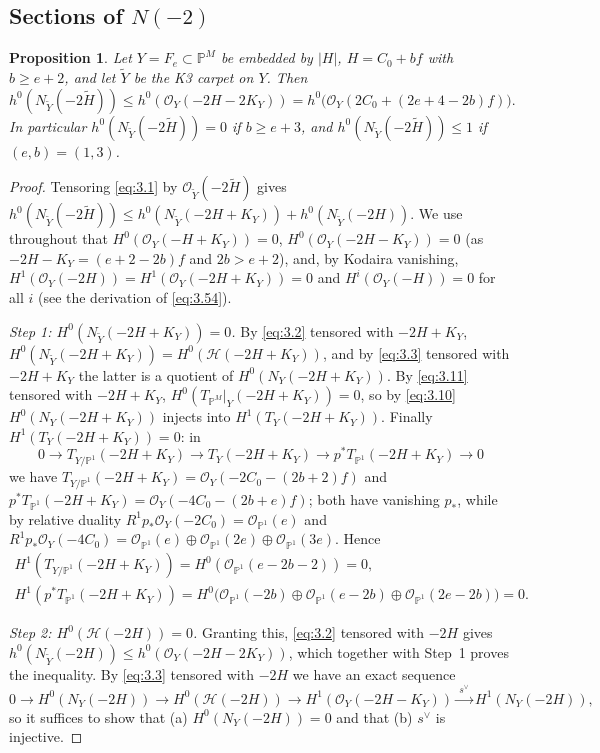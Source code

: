 \documentclass[11pt,reqno]{amsart}
\theoremstyle{plain}
\newtheorem{proposition}[theorem]{Proposition}
\theoremstyle{definition}
\newcommand{\PP}{\mathbb{P}}
\newcommand{\PM}{\mathbb{P}^M}
\newcommand{\OO}{\mathcal{O}}
\newcommand{\Yt}{\widetilde{Y}}
\newcommand{\Ht}{\widetilde{H}}
\newcommand{\NY}{N_{Y}}
\newcommand{\NYt}{N_{\Yt}}
\newcommand{\Hc}{\mathcal{H}}
\newcommand{\TP}{T_{\PM}|_Y}
\begin{document}
\subsection{Sections of \texorpdfstring{$N(-2)$}{N(-2)}}

\begin{proposition}\label{prop:N2}
Let $Y=F_e\subset\PM$ be embedded by $|H|$, $H=C_0+bf$ with $b\ge e+2$, and let $\Yt$ be the K3 carpet on $Y$. Then
\[
h^0(\NYt(-2\Ht))\le h^0(\OO_Y(-2H-2K_Y))=h^0\big(\OO_Y(2C_0+(2e+4-2b)f)\big).
\]
In particular $h^0(\NYt(-2\Ht))=0$ if $b\ge e+3$, and $h^0(\NYt(-2\Ht))\le1$ if $(e,b)=(1,3)$.
\end{proposition}

\begin{proof}
Tensoring \eqref{eq:3.1} by $\OO_{\Yt}(-2\Ht)$ gives $h^0(\NYt(-2\Ht))\le h^0(\NYt(-2H+K_Y))+h^0(\NYt(-2H))$. We use throughout that $H^0(\OO_Y(-H+K_Y))=0$, $H^0(\OO_Y(-2H-K_Y))=0$ (as $-2H-K_Y=(e+2-2b)f$ and $2b>e+2$), and, by Kodaira vanishing, $H^1(\OO_Y(-2H))=H^1(\OO_Y(-2H+K_Y))=0$ and $H^i(\OO_Y(-H))=0$ for all $i$ (see the derivation of \eqref{eq:3.54}).

\emph{Step 1: $H^0(\NYt(-2H+K_Y))=0$.} By \eqref{eq:3.2} tensored with $-2H+K_Y$, $H^0(\NYt(-2H+K_Y))=H^0(\Hc(-2H+K_Y))$, and by \eqref{eq:3.3} tensored with $-2H+K_Y$ the latter is a quotient of $H^0(\NY(-2H+K_Y))$. By \eqref{eq:3.11} tensored with $-2H+K_Y$, $H^0(\TP(-2H+K_Y))=0$, so by \eqref{eq:3.10} $H^0(\NY(-2H+K_Y))$ injects into $H^1(T_Y(-2H+K_Y))$. Finally $H^1(T_Y(-2H+K_Y))=0$: in
\[
0\to T_{Y/\PP^1}(-2H+K_Y)\to T_Y(-2H+K_Y)\to p^*T_{\PP^1}(-2H+K_Y)\to0
\]
we have $T_{Y/\PP^1}(-2H+K_Y)=\OO_Y(-2C_0-(2b+2)f)$ and $p^*T_{\PP^1}(-2H+K_Y)=\OO_Y(-4C_0-(2b+e)f)$; both have vanishing $p_*$, while by relative duality $R^1p_*\OO_Y(-2C_0)=\OO_{\PP^1}(e)$ and $R^1p_*\OO_Y(-4C_0)=\OO_{\PP^1}(e)\oplus\OO_{\PP^1}(2e)\oplus\OO_{\PP^1}(3e)$. Hence
\begin{gather*}
H^1(T_{Y/\PP^1}(-2H+K_Y))=H^0(\OO_{\PP^1}(e-2b-2))=0,\\
H^1(p^*T_{\PP^1}(-2H+K_Y))=H^0\big(\OO_{\PP^1}(-2b)\oplus\OO_{\PP^1}(e-2b)\oplus\OO_{\PP^1}(2e-2b)\big)=0 .
\end{gather*}

\emph{Step 2: $H^0(\Hc(-2H))=0$.} Granting this, \eqref{eq:3.2} tensored with $-2H$ gives $h^0(\NYt(-2H))\le h^0(\OO_Y(-2H-2K_Y))$, which together with Step~1 proves the inequality. By \eqref{eq:3.3} tensored with $-2H$ we have an exact sequence
\[
0\to H^0(\NY(-2H))\to H^0(\Hc(-2H))\to H^1(\OO_Y(-2H-K_Y))\xrightarrow{\ s^{\vee}\ }H^1(\NY(-2H)),
\]
so it suffices to show that (a) $H^0(\NY(-2H))=0$ and that (b) $s^{\vee}$ is injective.


\end{proof}
\end{document}

